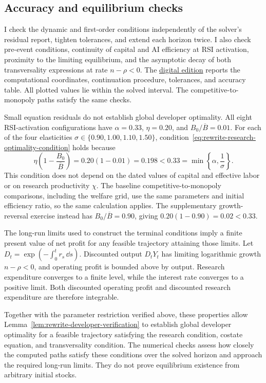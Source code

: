 \subsection{Accuracy and equilibrium checks}

I check the dynamic and first-order conditions independently of the
solver's residual report, tighten tolerances, and extend each horizon
twice. I also check pre-event conditions, continuity of capital and AI efficiency
at RSI activation,
proximity to the limiting equilibrium, and the asymptotic decay of both
transversality expressions at rate $n-\rho<0$. The
\href{https://oliverpardo1979.github.io/ai-growth-and-labor/\#app:rewrite-numerical-details}{digital edition}
reports the computational coordinates, continuation procedure, tolerances,
and accuracy table. All plotted values lie within the solved interval.
The competitive-to-monopoly paths satisfy the same checks.

\label{app:rewrite-numerical-support-checks}
Small equation residuals do not establish global developer optimality.
All eight RSI-activation configurations have $\alpha=0.33$, $\eta=0.20$,
and $B_0/\overline B=0.01$. For each of the four elasticities
$\sigma\in\{0.90,1.00,1.10,1.50\}$,
condition~\eqref{eq:rewrite-research-optimality-condition} holds because
\[
 \eta\left(1-\frac{B_0}{\overline B}\right)
 =0.20(1-0.01)=0.198<0.33
 =\min\left\{\alpha,\frac1\sigma\right\}.
\]
This condition does not depend on the dated values of capital and
effective labor or on research productivity $\chi$.
The baseline competitive-to-monopoly comparisons, including the welfare
grid, use the same parameters and initial efficiency ratio, so the same
calculation applies.
The supplementary growth-reversal exercise instead has
$B_0/\overline B=0.90$, giving $0.20(1-0.90)=0.02<0.33$.

The long-run limits used to construct the terminal conditions imply a
finite present value of net profit for any feasible trajectory attaining
those limits. Let $D_t=\exp(-\int_0^t r_s\,\dd s)$.
Discounted output $D_tY_t$ has limiting logarithmic growth $n-\rho<0$,
and operating profit is bounded above by output. Research expenditure
converges to a finite level, while the interest rate converges to a
positive limit. Both discounted operating profit and discounted research
expenditure are therefore integrable.

Together with the parameter restriction verified above, these properties
allow Lemma~\ref{lem:rewrite-developer-verification} to establish global
developer optimality for a feasible trajectory satisfying the research
condition, costate equation, and transversality condition.
The numerical checks assess how closely the computed paths satisfy these
conditions over the solved horizon and approach the required long-run
limits. They do not prove equilibrium existence from arbitrary initial
stocks.

